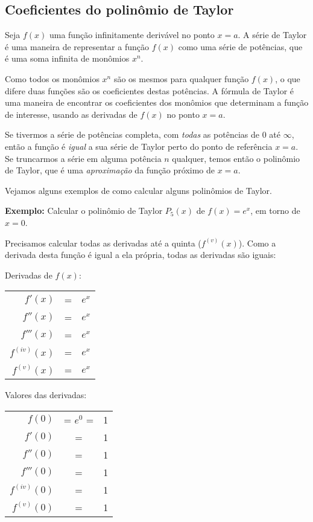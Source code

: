 \documentclass[a4paper]{article}
\begin{document}
\subsection{Coeficientes do polinômio de Taylor}

Seja $f(x)$ uma função infinitamente derivável no ponto $x=a$.
A série de Taylor é uma maneira de representar a função $f(x)$ como uma série de potências, que é uma soma infinita de monômios $x^n$.

Como todos os monômios $x^n$ são os mesmos para qualquer função $f(x)$, o que difere duas funções são os coeficientes destas potências.
A fórmula de Taylor é uma maneira de encontrar os coeficientes dos monômios que determinam a função de interesse, usando as derivadas de $f(x)$ no ponto $x=a$.

Se tivermos a série de potências completa, com {\em todas} as potências de $0$ até $\infty$, então a função é {\em igual} a sua série de Taylor perto do ponto de referência $x=a$.
Se truncarmos a série em alguma potência $n$ qualquer, temos então o polinômio de Taylor, que é uma {\em aproximação} da função próximo de $x=a$.

Vejamos alguns exemplos de como calcular alguns polinômios de Taylor.

\hrulefill

{\bf Exemplo:} Calcular o polinômio de Taylor $P_5(x)$ de $f(x)=e^x$, em torno de $x=0$.

Precisamos calcular todas as derivadas até a quinta ($f^{(v)}(x)$).
Como a derivada desta função é igual a ela própria, todas as derivadas são iguais:

\begin{multicols}{2}

Derivadas de $f(x)$:

  \begin{tabular}{rcl}
    $f'(x)$ &=& $e^x$\\
    $f''(x)$ &=& $e^x$\\
    $f'''(x)$ &=& $e^x$\\
    $f^{(iv)}(x)$ &=& $e^x$\\
    $f^{(v)}(x)$ &=& $e^x$\\
  \end{tabular}

  \columnbreak

Valores das derivadas:

  \begin{tabular}{rcl}
    $f(0)$ &= $e^0$ =& 1\\
    $f'(0)$ &=& 1\\
    $f''(0)$ &=& 1\\
    $f'''(0)$ &=& 1\\
    $f^{(iv)}(0)$ &=& 1\\
    $f^{(v)}(0)$ &=& 1\\
  \end{tabular}
\end{multicols}
\end{document}
